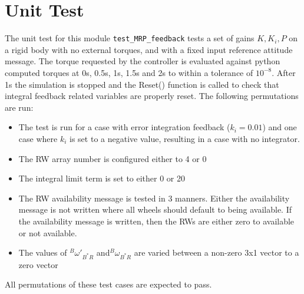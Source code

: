 \documentclass[]{BasiliskReportMemo}
\begin{document}
\section{Unit Test}
The unit test for this module \verb|test_MRP_feedback| tests a set of gains $K,K_i,P$ on a rigid body with no external torques, and with a fixed input reference attitude message. The torque requested by the controller is evaluated against python computed torques at 0s, 0.5s, 1s, 1.5s and 2s to within a tolerance of $10^{-8}$. After 1s the simulation is stopped and the Reset() function is called to check that integral feedback related variables are properly reset.  The following permutations are run:
\begin{itemize}
	\item The test is run for a case with error integration feedback ($k_i=0.01$) and one case where $k_i$ is set to a negative value, resulting in a case with no integrator. 
	\item The RW array number is configured either to 4 or 0
	\item The integral limit term is set to either 0 or 20
	\item The RW availability message is tested in 3 manners.  Either the availability  message is not written where all wheels should default to being available.  If the availability message is written, then the RWs are either zero to available or not available.
	\item The values of $^B\omega'_{B^*R}$ and$^B\omega_{B^*R}$ are varied between a non-zero 3x1 vector to a zero vector
\end{itemize}
All permutations of these test cases are expected to pass.
\end{document}
